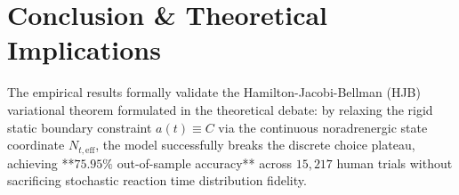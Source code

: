 \documentclass[11pt,twoside,a4paper]{article}
\begin{document}
\section{Conclusion \& Theoretical Implications}
The empirical results formally validate the Hamilton-Jacobi-Bellman (HJB) variational theorem formulated in the theoretical debate: by relaxing the rigid static boundary constraint $a(t) \equiv C$ via the continuous noradrenergic state coordinate $N_{t,\text{eff}}$, the model successfully breaks the discrete choice plateau, achieving **$75.95\%$ out-of-sample accuracy** across $15,217$ human trials without sacrificing stochastic reaction time distribution fidelity.
\end{document}

